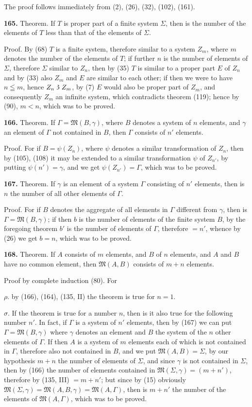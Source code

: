 \documentclass[oneside]{book}
\newcommand\partof{\mathrel{\raisebox{0.45ex}{$\mathfrak{3}$}}}   %
\newcommand\mypara{\medskip\textbf}
\begin{document}
The proof follows immediately from (2), (26), (32),
(102), (161).

\mypara{165.} Theorem. If $T$ is proper part of a finite system
$\Sigma$, then is the number of the elements of $T$ less
than that of the elements of $\Sigma$.

Proof. By (68) $T$ is a finite system, therefore
similar to a system $Z_m$, where $m$ denotes the number
of the elements of $T$; if further $n$ is the number of
elements of $\Sigma$, therefore $\Sigma$ similar to $Z_n$, then by (35)
$T$ is similar to a proper part $E$ of $Z_n$ and by (33) also
$Z_m$ and $E$ are similar to each other; if then we were
to have $n \leqq m$, hence $Z_n \partof Z_m$, by (7) $E$ would also be
proper part of $Z_m$, and consequently $Z_m$ an infinite
system, which contradicts theorem (119); hence by
(90), $m<n$, which was to be proved.

\mypara{166.} Theorem. If $\Gamma=\mathfrak{M}(B,\gamma)$, where $B$ denotes
a system of $n$ elements, and $\gamma$ an element of $\Gamma$ not
contained in $B$, then $\Gamma$ consists of $n'$ elements.

Proof. For if $B=\psi(Z_n)$, where $\psi$ denotes a similar
transformation of $Z_n$, then by (105), (108) it may
be extended to a similar transformation $\psi$ of $Z_{n'}$, by
putting $\psi(n')=\gamma$, and we get $\psi(Z_{n'})=\Gamma$, which was to
be proved.

\mypara{167.} Theorem. If $\gamma$ is an element of a system $\Gamma$
consisting of $n'$ elements, then is $n$ the number of all
other elements of $\Gamma$.

Proof. For if $B$ denotes the aggregate of all elements
in $\Gamma$ different from $\gamma$, then is $\Gamma=\mathfrak{M}(B,\gamma)$; if
then $b$ is the number of elements of the finite system
$B$, by the foregoing theorem $b'$ is the number of elements
of $\Gamma$, therefore $=n'$, whence by (26) we get
$b=n$, which was to be proved.

\mypara{168.} Theorem. If $A$ consists of $m$ elements, and
$B$ of $n$ elements, and $A$ and $B$ have no common element,
then $\mathfrak{M}(A,B)$ consists of $m+n$ elements.

Proof by complete induction (80). For

$\rho$. by (166), (164), (135, II) the theorem is true
for $n = 1$.

$\sigma$. If the theorem is true for a number $n$, then is it
also true for the following number $n'$. In fact, if $\Gamma$ is
a system of $n'$ elements, then by (167) we can put
$\Gamma=\mathfrak{M}(B,\gamma)$ where $\gamma$ denotes an element and $B$ the
system of the $n$ other elements of $\Gamma$. If then $A$ is a
system of $m$ elements each of which is not contained
in $\Gamma$, therefore also not contained in $B$, and we put
$\mathfrak{M}(A,B)=\Sigma$, by our hypothesis $m+n$ the number
of elements of $\Sigma$, and since $\gamma$ is not contained in $\Sigma$,
then by (166) the number of elements contained in
$\mathfrak{M}(\Sigma,\gamma)=(m+n')$, therefore by (135, III) $=m+n'$;
but since by (15) obviously $\mathfrak{M}(\Sigma,\gamma)=\mathfrak{M}(A,B,\gamma)=
\mathfrak{M}(A,\Gamma)$, then is $m+n'$ the number of the elements
of $\mathfrak{M}(A,\Gamma)$, which was to be proved.
\end{document}
